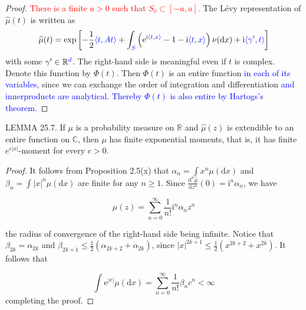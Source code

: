 \documentclass[a4paper,11pt]{article}
\begin{document}
\begin{proof}
    \textcolor{red}{There is a finite $a>0$ such that $S_{\nu} \subset[-a, a]$.} The Lévy representation of $\widehat{\mu}(t)$ is written as
    $$
        \widehat{\mu}(t)=\exp \left[-\frac{1}{2} \textcolor{blue}{\langle t, At \rangle} +\int_{\textcolor{blue}{S}}\left(\mathrm{e}^{\mathrm{i} \textcolor{blue}{\langle t, x \rangle}}-1-\mathrm{i} \textcolor{blue}{\langle t, x \rangle}\right) \nu(\mathrm{d} x)+\mathrm{i} \textcolor{blue}{\langle \gamma', t \rangle}\right]
    $$
    with some $\gamma^{\prime} \in \mathbb{R}\textcolor{blue}{^{d}}$. The right-hand side is meaningful even if $t$ is complex. Denote
    this function by $\Phi(t)$. Then $\Phi(t)$ is an entire function \textcolor{blue}{in each of its variables}, since we can exchange the order of integration and differentiation \textcolor{blue}{and innerproducts are analytical}.
    \textcolor{blue}{Thereby $\Phi(t)$ is also entire by Hartogs's theorem.}
\end{proof}


LEMMA 25.7. If $\mu$ is a probability measure on $\mathbb{R}$ and $\widehat{\mu}(z)$ is extendible to an entire
function on $\mathbb{C}$, then $\mu$ has finite exponential moments, that is, it has finite $e^{c|x|}$-moment for every $c>0$.

\begin{proof}
    It follows from Proposition 2.5(x) that $\alpha_{n}=\int x^{n} \mu(\mathrm{d} x)$ and
    $\beta_{n}=\int|x|^{n} \mu(\mathrm{d} x)$ are finite for any $n \geq 1$. Since
    $\frac{\mathrm{d}^{n} \widehat{\mu}}{\mathrm{d} z^{n}}(0)=\mathrm{i}^{n} \alpha_{n}$, we have

    $$
        \widehat{\mu}(z)=\sum_{n=0}^{\infty} \frac{1}{n !} \mathrm{i}^{n} \alpha_{n} z^{n}
    $$

    the radius of convergence of the right-hand side being infinite. Notice that $\beta_{2 k}=\alpha_{2 k}$ and
    $\beta_{2 k+1} \leq \frac{1}{2}\left(\alpha_{2 k+2}+\alpha_{2 k}\right)$, since
    $|x|^{2 k+1} \leq \frac{1}{2}\left(x^{2 k+2}+x^{2 k}\right)$. It follows that

    $$
        \int \mathrm{e}^{|x|} \mu(\mathrm{d} x)=\sum_{n=0}^{\infty} \frac{1}{n !} \beta_{n} c^{n}<\infty
    $$
    completing the proof.

\end{proof}
\end{document}
